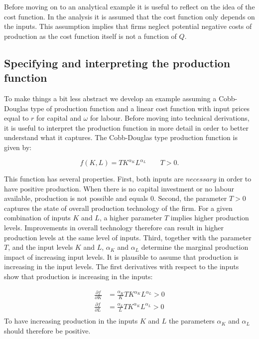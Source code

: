 \documentclass[
]{book}
\begin{document}
Before moving on to an analytical example it is useful to reflect on the idea of the cost function. In the analysis it is assumed that the cost function only depends on the inputs. This assumption implies that firms neglect potential negative costs of production as the cost function itself is not a function of \(Q\).

\hypertarget{specifying-and-interpreting-the-production-function}{%
\subsection{Specifying and interpreting the production function}\label{specifying-and-interpreting-the-production-function}}

To make things a bit less abstract we develop an example assuming a Cobb-Douglas type of production function and a linear cost function with input prices equal to \(r\) for capital and \(\omega\) for labour. Before moving into technical derivations, it is useful to interpret the production function in more detail in order to better understand what it captures. The Cobb-Douglas type production function is given by:

\begin{equation}
f(K,L) = TK^{\alpha_K}L^{\alpha_L} \qquad T >0.
\end{equation}

This function has several properties. First, both inputs are \(necessary\) in order to have positive production. When there is no capital investment or no labour available, production is not possible and equals \(0\). Second, the parameter \(T>0\) captures the state of overall production technology of the firm. For a given combination of inputs \(K\) and \(L\), a higher parameter \(T\) implies higher production levels. Improvements in overall technology therefore can result in higher production levels at the same level of inputs. Third, together with the parameter \(T\), and the input levels \(K\) and \(L\), \(\alpha_K\) and \(\alpha_L\) determine the marginal production impact of increasing input levels. It is plausible to assume that production is increasing in the input levels. The first derivatives with respect to the inputs show that production is increasing in the inputs:

\begin{align}
\frac{\partial f}{\partial K} &= \frac{\alpha_K}{ K} TK^{\alpha_K}L^{\alpha_L} >0 \\
\frac{\partial f}{\partial L} &= \frac{\alpha_L}{ L} TK^{\alpha_K}L^{\alpha_L} >0 \\
\end{align}
To have increasing production in the inputs \(K\) and \(L\) the parameters \(\alpha_K\) and \(\alpha_L\) should therefore be positive.
\end{document}
